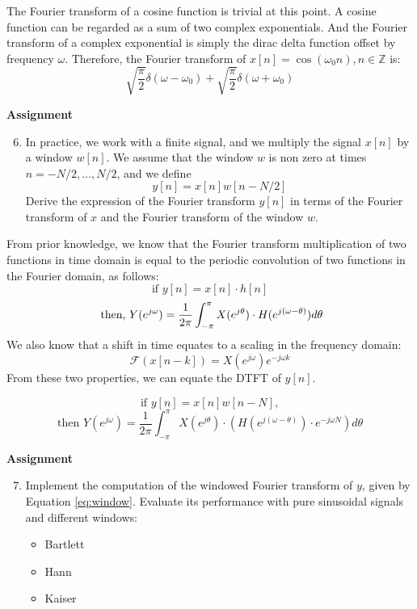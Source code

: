 \documentclass{article} %
\begin{document}
The Fourier transform of a cosine function is trivial at this point. A cosine function can be regarded as a sum of two complex exponentials. And the Fourier transform of a complex
exponential is simply the dirac delta function offset by frequency $\omega$. 
Therefore, the Fourier transform of $x[n]=\cos(\omega_0 n), n \in\mathbb{Z}$ is:\\
\[ \sqrt{\frac{\pi}{2}}\delta(\omega-\omega_0)+\sqrt{\frac{\pi}{2}}\delta(\omega+\omega_0)\]


\begin{framed}
\textbf{Assignment}
\begin{enumerate}
\setcounter{enumi}{5}
\item In practice, we work with a finite signal, and we multiply the signal $x[n]$ by a window $w[n]$. We assume that the window $w$ is non zero at times $n=-N/2,\dots,N/2$, 
and we define
\begin{equation} y[n]=x[n]w[n-N/2] \end{equation}
Derive the expression of the Fourier transform $y[n]$ in terms of the Fourier transform of $x$ and the Fourier transform of the window $w$. 
\end{enumerate}
\end{framed}

From prior knowledge, we know that the Fourier transform multiplication of two functions in time domain is equal to the periodic convolution of two functions in the Fourier domain, as follows:
\[\text{if } y[n]=x[n]\cdot h[n] \]
\[\text{ then, }\\
Y(e^{j\omega})=\frac{1}{2\pi}\int_{-\pi}^{\pi}X(e^{j\theta}) \cdot H(e^{j(\omega-\theta)}) d\theta
\]
We also know that a shift in time equates to a scaling in the frequency domain:
\[\mathcal{F}(x[n-k])=X(e^{j\omega})e^{-j\omega k}
\]
From these two properties, we can equate the DTFT of $y[n]$. 

\[\text{if } y[n]=x[n]w[n-N],\]
\[\text{then } Y(e^{j\omega})=\frac{1}{2\pi}\int_{-\pi}^{\pi}X(e^{j\theta}) \cdot (H(e^{j(\omega-\theta)})\cdot e^{-j\omega N}) d\theta\]



\begin{framed}
\textbf{Assignment}
\begin{enumerate}
\setcounter{enumi}{6}
\item Implement the computation of the windowed Fourier transform of $y$, given by Equation \ref{eq:window}.
Evaluate its performance with pure sinusoidal signals and different windows:
\begin{itemize}
\item Bartlett
\item Hann
\item Kaiser
\end{itemize}
\end{enumerate}
\end{framed}
\end{document}
